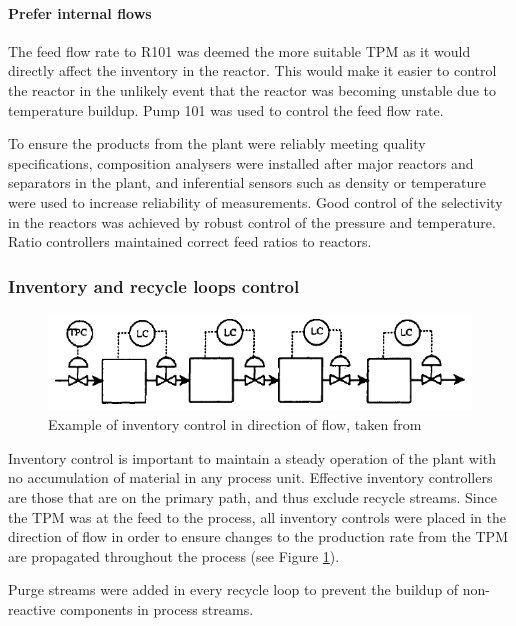 \paragraph{Prefer internal flows}
The feed flow rate to R101 was deemed the more suitable TPM as it would directly affect the inventory in the reactor. This would make it easier to control the reactor in the unlikely event that the reactor was becoming unstable due to temperature buildup. Pump 101 was used to control the feed flow rate.

To ensure the products from the plant were reliably meeting quality specifications, composition analysers were installed after major reactors and separators in the plant, and inferential sensors such as density or temperature were used to increase reliability of measurements. Good control of the selectivity in the reactors was achieved by robust control of the pressure and temperature. Ratio controllers maintained correct feed ratios to reactors.

\subsubsection{Inventory and recycle loops control}

\begin{figure}
    \centering
    \includegraphics[width=\linewidth]{chapters/4-operation-control/4-Figures/TPM-Price-1994.png}
    \caption{Example of inventory control in direction of flow, taken from \textcite{}}
    \label{fig:TPM}
\end{figure}
Inventory control is important to maintain a steady operation of the plant with no accumulation of material in any process unit. Effective inventory controllers are those that are on the primary path, and thus exclude recycle streams. Since the TPM was at the feed to the process, all inventory controls were placed in the direction of flow in order to ensure changes to the production rate from the TPM are propagated throughout the process (see Figure \ref{fig:TPM}). 

Purge streams were added in every recycle loop to prevent the buildup of non-reactive components in process streams.  



